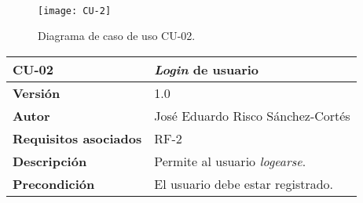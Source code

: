 \strut\strut
\

\begin{figure}[H]
	\centering
	\texttt{[image: CU-2]}
	\caption{Diagrama de caso de uso CU-02.}
	\label{fig:CU-2}
\end{figure}

\strut
\begin{longtable}[H]{@{}ll@{}}
\toprule
\begin{minipage}[b]{0.23\columnwidth}\raggedright\strut
\textbf{CU-02}\strut
\end{minipage} & \begin{minipage}[b]{0.71\columnwidth}\raggedright\strut
\textbf{\emph{Login} de usuario}\strut
\end{minipage}\tabularnewline
\midrule
\endhead
\begin{minipage}[t]{0.23\columnwidth}\raggedright\strut
\textbf{Versión}\strut
\end{minipage} & \begin{minipage}[t]{0.71\columnwidth}\raggedright\strut
1.0\strut
\end{minipage}\tabularnewline
\begin{minipage}[t]{0.23\columnwidth}\raggedright\strut
\textbf{Autor}\strut
\end{minipage} & \begin{minipage}[t]{0.71\columnwidth}\raggedright\strut
José Eduardo Risco Sánchez-Cortés\strut
\end{minipage}\tabularnewline
\begin{minipage}[t]{0.23\columnwidth}\raggedright\strut
\textbf{Requisitos asociados}\strut
\end{minipage} & \begin{minipage}[t]{0.71\columnwidth}\raggedright\strut
RF-2\strut
\end{minipage}\tabularnewline
\begin{minipage}[t]{0.23\columnwidth}\raggedright\strut
\textbf{Descripción}\strut
\end{minipage} & \begin{minipage}[t]{0.71\columnwidth}\raggedright\strut
Permite al usuario \emph{logearse}.\strut
\end{minipage}\tabularnewline
\begin{minipage}[t]{0.23\columnwidth}\raggedright\strut
\textbf{Precondición}\strut
\end{minipage} & \begin{minipage}[t]{0.71\columnwidth}\raggedright\strut
El usuario debe estar registrado.\strut

\end{minipage}
\end{longtable}
